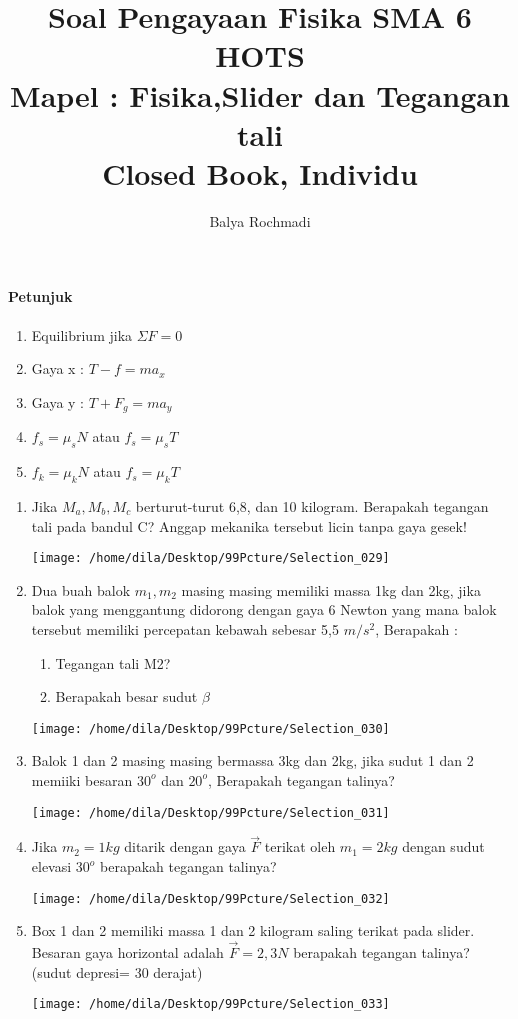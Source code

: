\documentclass[12pt,a4paper,draft,final,oneside,twoside,openright,openany]{article}
\author{Balya Rochmadi}
\title{Soal Pengayaan Fisika SMA 6 HOTS\\Mapel : Fisika,Slider dan Tegangan tali\\ Closed Book, Individu}
\begin{document}
	\maketitle
	\noindent\makebox[\linewidth]{\rule{\paperwidth}{0.4pt}}
	\paragraph{\Large Petunjuk}
	\begin{enumerate}
		\item Equilibrium jika $\Sigma F=0$
		\item Gaya x : $T-f=ma_x$
		\item Gaya y : $T+F_g=ma_y$
		\item $f_s=\mu_s N$ atau $f_s=\mu_s T$
		\item $f_k=\mu_k N $ atau $f_s=\mu_k T$
	\end{enumerate}
	\noindent\makebox[\linewidth]{\rule{\paperwidth}{0.4pt}}
	\begin{enumerate}
		\item Jika $M_a, M_b, M_c$ berturut-turut 6,8, dan 10 kilogram. Berapakah tegangan tali pada bandul C? Anggap mekanika tersebut licin tanpa gaya gesek!
	\begin{center}
		\texttt{[image: /home/dila/Desktop/99Pcture/Selection\_029]}
	\end{center}
		\item Dua buah balok $m_1,m_2$ masing masing memiliki massa 1kg dan 2kg, jika balok yang menggantung didorong dengan gaya 6 Newton yang mana balok tersebut memiliki percepatan kebawah sebesar 5,5 $m/s^2$, Berapakah :
		\begin{enumerate}
			\item Tegangan tali M2?
			\item Berapakah besar sudut $\beta$
		\end{enumerate}
			\begin{center}
				\texttt{[image: /home/dila/Desktop/99Pcture/Selection\_030]}
			\end{center}
		\item Balok 1 dan 2 masing masing bermassa 3kg dan 2kg, jika sudut 1 dan 2 memiiki besaran $30^o$ dan $20^o$, Berapakah tegangan talinya?
					\begin{center}
						\texttt{[image: /home/dila/Desktop/99Pcture/Selection\_031]}
					\end{center}
		\item Jika $m_2=1kg$ ditarik dengan gaya $\vec{F}$ terikat oleh $m_1=2kg$ dengan sudut elevasi $30^o$ berapakah tegangan talinya?
		\begin{center}
			\texttt{[image: /home/dila/Desktop/99Pcture/Selection\_032]}
		\end{center}
		\item Box 1 dan 2 memiliki massa 1 dan 2 kilogram saling terikat pada slider. Besaran gaya horizontal adalah $\vec{F}=2,3 N$ berapakah tegangan talinya? (sudut depresi= 30 derajat)
			\begin{center}
				\texttt{[image: /home/dila/Desktop/99Pcture/Selection\_033]}
			\end{center}
	\end{enumerate}
\end{document}
